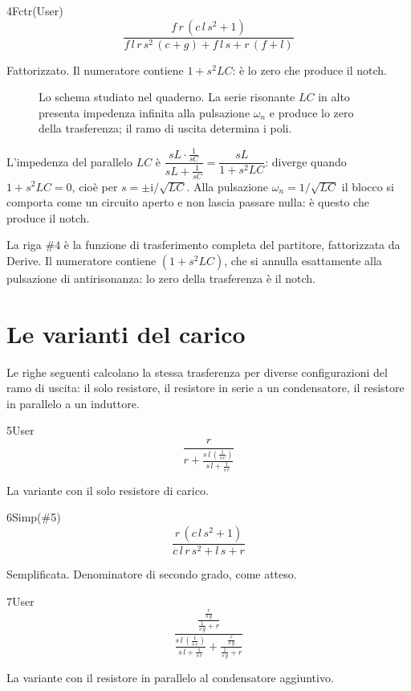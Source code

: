 \begin{espr}{4}{Fctr(User)}{}
\[
\frac{f\, r\, \left(c\, l\, s^{2} + 1\right)}{f\, l\, r\, s^{2}\, \left(c + g\right) + f\, l\, s + r\, \left(f + l\right)}
\]
\end{espr}
Fattorizzato. Il numeratore contiene $1+s^2LC$: è lo zero che produce il notch.

\begin{figure}[htbp]
  \centering
  
  \caption{Lo schema studiato nel quaderno. La serie risonante $LC$ in alto presenta impedenza infinita alla pulsazione $\omega_n$ e produce lo zero della trasferenza; il ramo di uscita determina i poli.}
  \label{fig:notch_circuito}
\end{figure}

L'impedenza del parallelo $LC$ è $\dfrac{sL\cdot\frac{1}{sC}}{sL+\frac{1}{sC}}=\dfrac{sL}{1+s^2LC}$: diverge quando $1+s^2LC=0$, cioè per $s=\pm\mathrm{i}/\sqrt{LC}$. Alla pulsazione $\omega_n=1/\sqrt{LC}$ il blocco si comporta come un circuito aperto e non lascia passare nulla: è questo che produce il notch.

La riga $\#4$ è la funzione di trasferimento completa del partitore, fattorizzata da Derive. Il numeratore contiene $\left(1+s^2LC\right)$, che si annulla esattamente alla pulsazione di antirisonanza: lo zero della trasferenza è il notch.

\section{Le varianti del carico}

Le righe seguenti calcolano la stessa trasferenza per diverse configurazioni del ramo di uscita: il solo resistore, il resistore in serie a un condensatore, il resistore in parallelo a un induttore.

\begin{espr}{5}{User}{}
\[
\frac{r}{r + \frac{s\, l\, \left(\frac{1}{s\, c}\right)}{s\, l + \frac{1}{s\, c}}}
\]
\end{espr}
La variante con il solo resistore di carico.

\begin{espr}{6}{Simp(\#5)}{}
\[
\frac{r\, \left(c\, l\, s^{2} + 1\right)}{c\, l\, r\, s^{2} + l\, s + r}
\]
\end{espr}
Semplificata. Denominatore di secondo grado, come atteso.

\begin{espr}{7}{User}{}
\[
\frac{\frac{\frac{r}{s\, g}}{\frac{1}{s\, g} + r}}{\frac{s\, l\, \left(\frac{1}{s\, c}\right)}{s\, l + \frac{1}{s\, c}} + \frac{\frac{r}{s\, g}}{\frac{1}{s\, g} + r}}
\]
\end{espr}
La variante con il resistore in parallelo al condensatore aggiuntivo.

